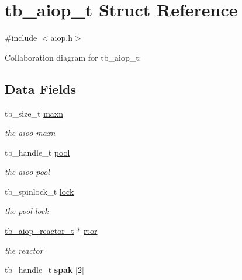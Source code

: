 \hypertarget{structtb__aiop__t}{\section{tb\-\_\-aiop\-\_\-t Struct Reference}
\label{structtb__aiop__t}
}


{\ttfamily \#include $<$aiop.\-h$>$}



Collaboration diagram for tb\-\_\-aiop\-\_\-t\-:
\subsection*{Data Fields}
\begin{DoxyCompactItemize}
\item 
\hypertarget{structtb__aiop__t_a0be5c9ec63e4cabb7001a20314844cd3}{tb\-\_\-size\-\_\-t \hyperlink{structtb__aiop__t_a0be5c9ec63e4cabb7001a20314844cd3}{maxn}}\label{structtb__aiop__t_a0be5c9ec63e4cabb7001a20314844cd3}

\begin{DoxyCompactList}\small\item\em the aioo maxn \end{DoxyCompactList}\item 
\hypertarget{structtb__aiop__t_a372aeaa64dc380cdd7ed743375c2f9e7}{tb\-\_\-handle\-\_\-t \hyperlink{structtb__aiop__t_a372aeaa64dc380cdd7ed743375c2f9e7}{pool}}\label{structtb__aiop__t_a372aeaa64dc380cdd7ed743375c2f9e7}

\begin{DoxyCompactList}\small\item\em the aioo pool \end{DoxyCompactList}\item 
\hypertarget{structtb__aiop__t_ac16260503d757453bd4de5f8585cfdce}{tb\-\_\-spinlock\-\_\-t \hyperlink{structtb__aiop__t_ac16260503d757453bd4de5f8585cfdce}{lock}}\label{structtb__aiop__t_ac16260503d757453bd4de5f8585cfdce}

\begin{DoxyCompactList}\small\item\em the pool lock \end{DoxyCompactList}\item 
\hypertarget{structtb__aiop__t_af220a8b7e90dc42af3d50b00ea2f8ec4}{\hyperlink{structtb__aiop__reactor__t}{tb\-\_\-aiop\-\_\-reactor\-\_\-t} $\ast$ \hyperlink{structtb__aiop__t_af220a8b7e90dc42af3d50b00ea2f8ec4}{rtor}}\label{structtb__aiop__t_af220a8b7e90dc42af3d50b00ea2f8ec4}

\begin{DoxyCompactList}\small\item\em the reactor \end{DoxyCompactList}\item 
\hypertarget{structtb__aiop__t_a19684fa62121d4314b951afee72c6572}{tb\-\_\-handle\-\_\-t {\bfseries spak} \mbox{[}2\mbox{]}}\label{structtb__aiop__t_a19684fa62121d4314b951afee72c6572}

\end{DoxyCompactItemize}


